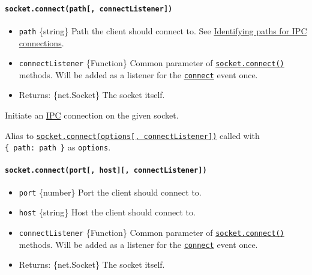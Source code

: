 \paragraph{\texorpdfstring{\texttt{socket.connect(path{[},\ connectListener{]})}}{socket.connect(path{[}, connectListener{]})}}\label{socket.connectpath-connectlistener}

\begin{itemize}
\tightlist
\item
  \texttt{path} \{string\} Path the client should connect to. See
  \hyperref[identifying-paths-for-ipc-connections]{Identifying paths for
  IPC connections}.
\item
  \texttt{connectListener} \{Function\} Common parameter of
  \hyperref[socketconnect]{\texttt{socket.connect()}} methods. Will be
  added as a listener for the
  \hyperref[event-connect]{\texttt{\textquotesingle{}connect\textquotesingle{}}}
  event once.
\item
  Returns: \{net.Socket\} The socket itself.
\end{itemize}

Initiate an \hyperref[ipc-support]{IPC} connection on the given socket.

Alias to
\hyperref[socketconnectoptions-connectlistener]{\texttt{socket.connect(options{[},\ connectListener{]})}}
called with \texttt{\{\ path:\ path\ \}} as \texttt{options}.

\paragraph{\texorpdfstring{\texttt{socket.connect(port{[},\ host{]}{[},\ connectListener{]})}}{socket.connect(port{[}, host{]}{[}, connectListener{]})}}\label{socket.connectport-host-connectlistener}

\begin{itemize}
\tightlist
\item
  \texttt{port} \{number\} Port the client should connect to.
\item
  \texttt{host} \{string\} Host the client should connect to.
\item
  \texttt{connectListener} \{Function\} Common parameter of
  \hyperref[socketconnect]{\texttt{socket.connect()}} methods. Will be
  added as a listener for the
  \hyperref[event-connect]{\texttt{\textquotesingle{}connect\textquotesingle{}}}
  event once.
\item
  Returns: \{net.Socket\} The socket itself.
\end{itemize}

